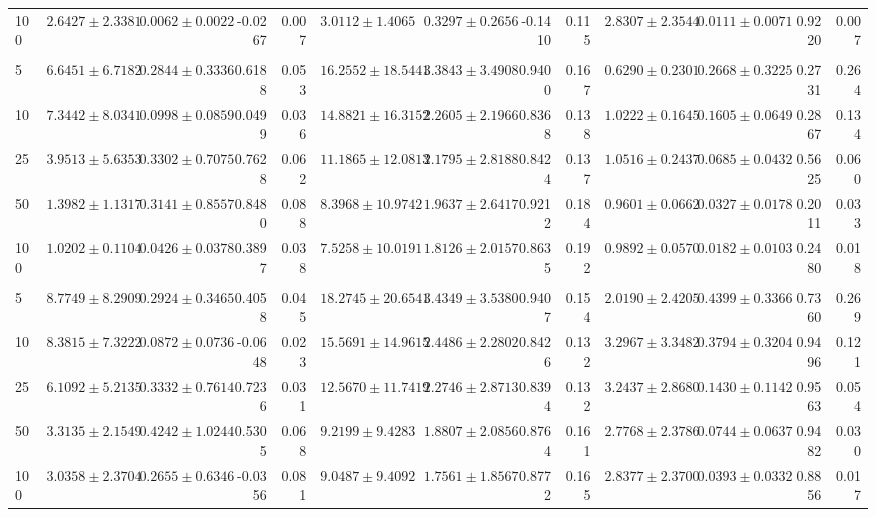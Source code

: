 \begin{tabular}{lrrrrrrrrrrrr}
100 & $2.6427 \pm 2.3381$ & $0.0062 \pm 0.0022$ & -0.0267 & 0.007 & $3.0112 \pm 1.4065$ & $0.3297 \pm 0.2656$ & -0.1410 & 0.115 & $2.8307 \pm 2.3544$ & $0.0111 \pm 0.0071$ & 0.9220 & 0.007 \\
\addlinespace
\multicolumn{13}{l}{\textit{Sin-Hom}} \\
5 & $6.6451 \pm 6.7182$ & $0.2844 \pm 0.3336$ & 0.6188 & 0.053 & $16.2552 \pm 18.5441$ & $3.3843 \pm 3.4908$ & 0.9400 & 0.167 & $0.6290 \pm 0.2301$ & $0.2668 \pm 0.3225$ & 0.2731 & 0.264 \\
10 & $7.3442 \pm 8.0341$ & $0.0998 \pm 0.0859$ & 0.0499 & 0.036 & $14.8821 \pm 16.3152$ & $2.2605 \pm 2.1966$ & 0.8368 & 0.138 & $1.0222 \pm 0.1645$ & $0.1605 \pm 0.0649$ & 0.2867 & 0.134 \\
25 & $3.9513 \pm 5.6353$ & $0.3302 \pm 0.7075$ & 0.7628 & 0.062 & $11.1865 \pm 12.0813$ & $2.1795 \pm 2.8188$ & 0.8424 & 0.137 & $1.0516 \pm 0.2437$ & $0.0685 \pm 0.0432$ & 0.5625 & 0.060 \\
50 & $1.3982 \pm 1.1317$ & $0.3141 \pm 0.8557$ & 0.8480 & 0.088 & $8.3968 \pm 10.9742$ & $1.9637 \pm 2.6417$ & 0.9212 & 0.184 & $0.9601 \pm 0.0662$ & $0.0327 \pm 0.0178$ & 0.2011 & 0.033 \\
100 & $1.0202 \pm 0.1104$ & $0.0426 \pm 0.0378$ & 0.3897 & 0.038 & $7.5258 \pm 10.0191$ & $1.8126 \pm 2.0157$ & 0.8635 & 0.192 & $0.9892 \pm 0.0570$ & $0.0182 \pm 0.0103$ & 0.2480 & 0.018 \\
\addlinespace
\multicolumn{13}{l}{\textit{Sin-Het}} \\
5 & $8.7749 \pm 8.2909$ & $0.2924 \pm 0.3465$ & 0.4058 & 0.045 & $18.2745 \pm 20.6541$ & $3.4349 \pm 3.5380$ & 0.9407 & 0.154 & $2.0190 \pm 2.4205$ & $0.4399 \pm 0.3366$ & 0.7360 & 0.269 \\
10 & $8.3815 \pm 7.3222$ & $0.0872 \pm 0.0736$ & -0.0648 & 0.023 & $15.5691 \pm 14.9615$ & $2.4486 \pm 2.2802$ & 0.8426 & 0.132 & $3.2967 \pm 3.3482$ & $0.3794 \pm 0.3204$ & 0.9496 & 0.121 \\
25 & $6.1092 \pm 5.2135$ & $0.3332 \pm 0.7614$ & 0.7236 & 0.031 & $12.5670 \pm 11.7419$ & $2.2746 \pm 2.8713$ & 0.8394 & 0.132 & $3.2437 \pm 2.8680$ & $0.1430 \pm 0.1142$ & 0.9563 & 0.054 \\
50 & $3.3135 \pm 2.1549$ & $0.4242 \pm 1.0244$ & 0.5305 & 0.068 & $9.2199 \pm 9.4283$ & $1.8807 \pm 2.0856$ & 0.8764 & 0.161 & $2.7768 \pm 2.3786$ & $0.0744 \pm 0.0637$ & 0.9482 & 0.030 \\
100 & $3.0358 \pm 2.3704$ & $0.2655 \pm 0.6346$ & -0.0356 & 0.081 & $9.0487 \pm 9.4092$ & $1.7561 \pm 1.8567$ & 0.8772 & 0.165 & $2.8377 \pm 2.3700$ & $0.0393 \pm 0.0332$ & 0.8856 & 0.017 \\
\bottomrule
\end{tabular}
